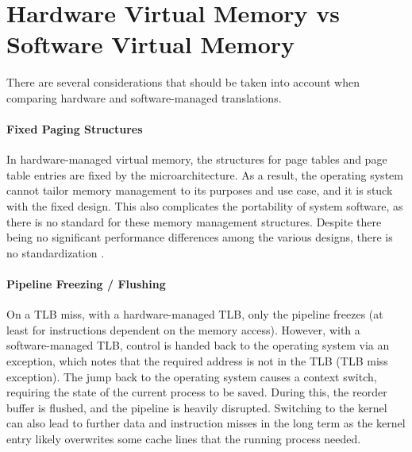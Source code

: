 \section{Hardware Virtual Memory vs Software Virtual Memory}

There are several considerations that should be taken into account when comparing hardware and
software-managed translations.

\paragraph{Fixed Paging Structures} In hardware-managed virtual memory, the structures for page tables
and page table entries are fixed by the microarchitecture. As a result, the operating system cannot tailor
memory management to its purposes and use case, and it is stuck with the fixed design.
This also complicates the portability of system software, as there is no standard for these memory management
structures. Despite there being no significant performance differences among the various designs,
there is no standardization \cite{jacob1998look}.

\paragraph{Pipeline Freezing / Flushing} On a TLB miss,
with a hardware-managed TLB, only the pipeline freezes (at least for instructions dependent on
the memory access). However, with a software-managed TLB, control is handed back to the operating system
via an exception, which notes that the required address is not in the TLB (TLB miss exception).
The jump back to the operating system causes a context switch, requiring the state of the current process
to be saved. During this, the reorder buffer is flushed, and the pipeline is heavily disrupted.
Switching to the kernel can also lead to further data and instruction misses in the long term
as the kernel entry likely overwrites some cache lines that the running process needed. 

